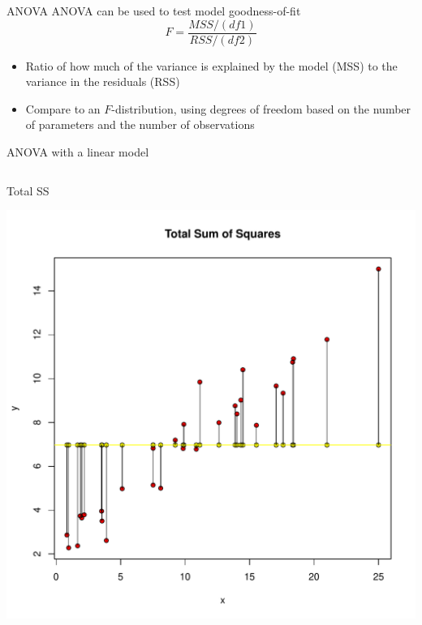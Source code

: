 \documentclass[aspectratio=169]{beamer}\usepackage[]{graphicx}\usepackage[]{color}
\makeatletter
\def\maxwidth{ %
  \ifdim\Gin@nat@width>\linewidth
    \linewidth
  \else
    \Gin@nat@width
  \fi
}
\newenvironment{knitrout}{}{} %
\makeatother
\begin{document}
\begin{frame}{ANOVA}
ANOVA can be used to test model goodness-of-fit
\begin{equation}
		F = \frac{MSS/(df1)}{RSS/(df2)} 
\end{equation}
\begin{itemize}
	\item Ratio of how much of the variance is explained by the model (MSS) to the variance in the residuals (RSS)
	\item Compare to an $F$-distribution, using degrees of freedom based on the number of parameters and the number of observations
\end{itemize}
\end{frame}

\begin{frame}[fragile]{ANOVA with a linear model}
\begin{columns}
  \begin{column}{0.33\textwidth}
		Total SS

\begin{knitrout}\scriptsize
{}\color{fgcolor}
\includegraphics[width=\maxwidth]{figure/unnamed-chunk-8-1} 


\end{knitrout}
\end{column}
\end{columns}
\end{frame}
\end{document}
